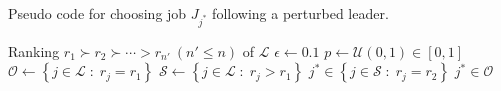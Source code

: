 \begin{algorithm}[t]
    \caption[Perturbed leader]{Pseudo code for choosing job 
    $J_{j^*}$ following a perturbed leader.}
    \label{pseudo:perturbedLeader}
    \begin{algorithmic}[1]
        \Require Ranking $r_1 \succ r_2 \succ \cdots > r_{n'} ~ (n' \leq n)$ of 
        $\mathcal{L}$ 
        \State $\epsilon \gets 0.1$ 
        \State $p \gets \mathcal{U}(0,1)\in [0,1]$
        \State $\mathcal{O} \gets \left\{j\in\mathcal{L}\;:\;r_j=r_1\right\}$ 
        \State $\mathcal{S} \gets \left\{j\in\mathcal{L}\;:\;r_j>r_1\right\}$
        \State \Return $j^* \in \left\{j\in\mathcal{S}\;:\;r_j=r_2\right\}$ 
        \Else 
        \State \Return $j^* \in\mathcal{O}$ 
        \EndIf
        \EndProcedure
    \end{algorithmic}
\end{algorithm}